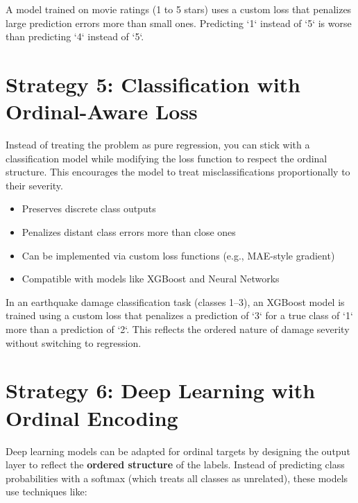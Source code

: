 \documentclass[12pt,openany]{book}
\begin{document}
\begin{examplebox}
A model trained on movie ratings (1 to 5 stars) uses a custom loss that 
penalizes large prediction errors more than small ones. Predicting `1` 
instead of `5` is worse than predicting `4` instead of `5`.
\end{examplebox}

\vspace{5pt}



\section{Strategy 5: Classification with Ordinal-Aware Loss}

Instead of treating the problem as pure regression, you can stick with a classification model while modifying the loss function to respect the ordinal structure. This encourages the model to treat misclassifications proportionally to their severity.

\begin{itemize}
    \item Preserves discrete class outputs
    \item Penalizes distant class errors more than close ones
    \item Can be implemented via custom loss functions (e.g., MAE-style gradient)
    \item Compatible with models like XGBoost and Neural Networks
\end{itemize}

\begin{examplebox}
In an earthquake damage classification task (classes 1–3), an XGBoost model is trained using a custom loss that penalizes a prediction of `3` for a true class of `1` more than a prediction of `2`. This reflects the ordered nature of damage severity without switching to regression.
\end{examplebox}

\vspace{5pt}



\section{Strategy 6: Deep Learning with Ordinal Encoding}

Deep learning models can be adapted for ordinal targets by designing the output layer to reflect the \textbf{ordered structure} of the labels. Instead of predicting class probabilities with a softmax (which treats all classes as unrelated), these models use techniques like:
\end{document}
